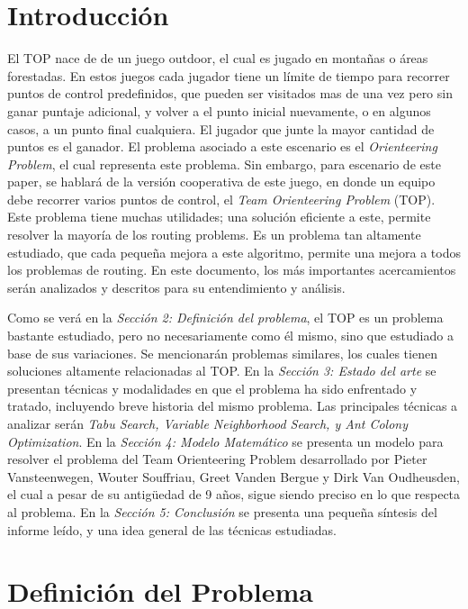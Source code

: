 \documentclass[letter, 10pt]{article}
\begin{document}
\section{Introducci\'on}

El TOP nace de de un juego outdoor, el cual es jugado en montañas o áreas forestadas. En estos juegos cada jugador tiene un límite de tiempo para recorrer puntos de control predefinidos, que pueden ser visitados mas de una vez pero sin ganar puntaje adicional, y volver a el punto inicial nuevamente, o en algunos casos, a un punto final cualquiera. El jugador que junte la mayor cantidad de puntos es el ganador. El problema asociado a este escenario es el \textit{Orienteering Problem}, el cual representa este problema. Sin embargo, para escenario de este paper, se hablará de la versión cooperativa de este juego, en donde un equipo debe recorrer varios puntos de control, el \textit{Team Orienteering Problem} (TOP). Este problema tiene muchas utilidades; una solución eficiente a este, permite resolver la mayoría de los routing problems. Es un problema tan altamente estudiado, que cada pequeña mejora a este algoritmo, permite una mejora a todos los problemas de routing. En este documento, los más importantes acercamientos serán analizados y descritos para su entendimiento y análisis.

   Como se verá en la \textit{Sección 2: Definición del problema}, el TOP es un problema bastante estudiado, pero no necesariamente como él mismo, sino que estudiado a base de sus variaciones. Se mencionarán problemas similares, los cuales tienen soluciones altamente relacionadas al TOP. 
    En la \textit{Sección 3: Estado del arte} se presentan técnicas y modalidades en que el problema ha sido enfrentado y tratado, incluyendo breve historia del mismo problema. Las principales técnicas a analizar serán \textit{Tabu Search, Variable Neighborhood Search, y Ant Colony Optimization}.
   En la \textit{Sección 4: Modelo Matemático} se presenta un modelo para resolver el problema del Team Orienteering Problem desarrollado por Pieter Vansteenwegen, Wouter Souffriau, Greet Vanden Bergue y Dirk Van Oudheusden, el cual a pesar de su antigüedad de 9 años, sigue siendo preciso en lo que respecta al problema.
   En la \textit{Sección 5: Conclusión} se presenta una pequeña síntesis del informe leído, y una idea general de las técnicas estudiadas.
   

\section{Definici\'on del Problema}
\end{document}
